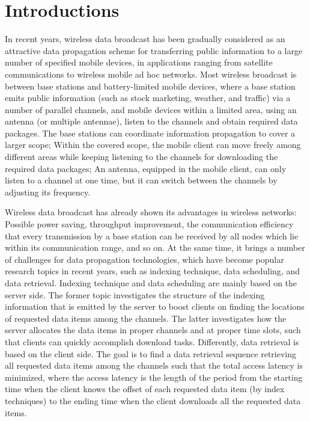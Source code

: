 \documentclass[11pt,english,onecolumn,draftcls]{IEEEtran}
\theoremstyle{plain}
\theoremstyle{plain}
\theoremstyle{plain}
\theoremstyle{plain}
\begin{document}
\section{Introductions}

In recent years, wireless data broadcast has been gradually considered
as an attractive data propagation scheme for transferring public information
to a large number of specified mobile devices, in applications ranging
from satellite communications to wireless mobile ad hoc networks.
Most wireless broadcast is between base stations and battery-limited
mobile devices, where a base station emits public information (such
as stock marketing, weather, and traffic) via a number of parallel
channels, and mobile devices within a limited area, using an antenna
(or multiple antennae), listen to the channels and obtain required
data packages. The base stations can coordinate information propagation
to cover a larger scope; Within the covered scope, the mobile client
can move freely among different areas while keeping listening to the
channels for downloading the required data packages; An antenna, equipped
in the mobile client, can only listen to a channel at one time, but
it can switch between the channels by adjusting its frequency.

Wireless data broadcast has already shown its advantages in wireless
networks: Possible power saving, throughput improvement, the communication
efficiency that every transmission by a base station can be received
by all nodes which lie within its communication range, and so on.
At the same time, it brings a number of challenges for data propagation
technologies, which have become popular research topics in recent
years, such as indexing technique, data scheduling, and data retrieval.
Indexing technique and data scheduling are mainly based on the server
side. The former topic investigates the structure of the indexing
information that is emitted by the server to boost clients on finding
the locations of requested data items among the channels. The latter
investigates how the server allocates the data items in proper channels
and at proper time slots, such that clients can quickly accomplish
download tasks. Differently, data retrieval is based on the client
side. The goal is to find a data retrieval sequence retrieving all
requested data items among the channels such that the total access
latency is minimized, where the access latency is the length of the
period from the starting time when the client knows the offset of
each requested data item (by index techniques) to the ending time
when the client downloads all the requested data items.
\end{document}
